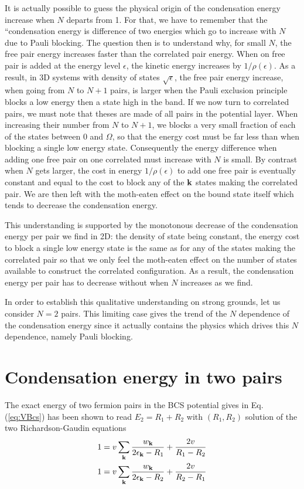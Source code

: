 \documentclass{article}
\begin{document}
It is actually possible to guess the physical origin of the condensation energy increase when $N$ departs from 1.  For that, we have to remember that the ``condensation energy is difference of two energies which go to increase with $N$ due to Pauli blocking.  The question then is to understand why, for small $N$, the free pair energy increases faster than the correlated pair energy.  When on free pair is added at the energy level $\epsilon$, the kinetic energy increases by $1/\rho(\epsilon)$.  As a result, in 3D systems with density of states $\sqrt{\epsilon}$, the free pair energy increase, when going from $N$ to $N+1$ pairs, is larger when the Pauli exclusion principle blocks a low energy then a state high in the band.  If we now turn to correlated pairs, we must note that theses are made of all pairs in the potential layer. When increasing their number from $N$ to $N+1$, we blocks a very small fraction of each of the states between $0$ and $\Omega$, so that the energy cost must be far less than when blocking a single low energy state.  Consequently the energy difference when adding one free pair on one correlated must increase with $N$ is small. By contrast when $N$ gets larger, the cost in energy $1/\rho(\epsilon)$ to add one free pair is eventually constant and equal to the cost to block any of the $\mathbf{k}$ states making the correlated pair.  We are then left with the moth-eaten effect on the bound state itself which tends to decrease the condensation energy. 

This understanding is supported by the monotonous decrease of the condensation energy per pair we find in 2D: the density of state being constant, the energy cost to block a single low energy state is the same as for any of the states making the correlated pair so that we only feel the moth-eaten effect on the number of states available to construct the correlated configuration.  As a result, the condensation energy per pair has to decrease without when $N$ increases as we find.  

In order to establish this qualitative understanding on strong grounds, let us consider $N=2$ pairs. This limiting case gives the trend of the $N$ dependence of the condensation energy since it actually contains the physics which drives this $N$ dependence, namely Pauli blocking.  


\section{Condensation energy in two pairs\label{sec:twoPair}}
The exact energy of two fermion pairs in the BCS potential gives in Eq. (\ref{eq:VBcs}) has been shown to read $E_2=R_1+R_2$ with $(R_1,R_2)$ solution of the two Richardson-Gaudin equations
\begin{equation}
\begin{split}
1&=v\sum_{\mathbf{k}}\frac{w_{\mathbf{k}}}{2\epsilon_{\mathbf{k}}-R_1}+\frac{2v}{R_1-R_2}\\
1&=v\sum_{\mathbf{k}}\frac{w_{\mathbf{k}}}{2\epsilon_{\mathbf{k}}-R_2}+\frac{2v}{R_2-R_1}
\end{split}
\label{eq:richardsonEq}
\end{equation}
\end{document}
